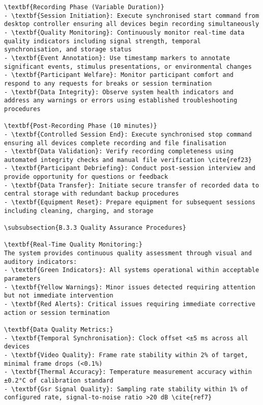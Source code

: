 \begin{verbatim}
\textbf{Recording Phase (Variable Duration)}
- \textbf{Session Initiation}: Execute synchronised start command from desktop controller ensuring all devices begin recording simultaneously
- \textbf{Quality Monitoring}: Continuously monitor real-time data quality indicators including signal strength, temporal synchronisation, and storage status
- \textbf{Event Annotation}: Use timestamp markers to annotate significant events, stimulus presentations, or environmental changes
- \textbf{Participant Welfare}: Monitor participant comfort and respond to any requests for breaks or session termination
- \textbf{Data Integrity}: Observe system health indicators and address any warnings or errors using established troubleshooting procedures

\textbf{Post-Recording Phase (10 minutes)}
- \textbf{Controlled Session End}: Execute synchronised stop command ensuring all devices complete recording and file finalisation
- \textbf{Data Validation}: Verify recording completeness using automated integrity checks and manual file verification \cite{ref23}
- \textbf{Participant Debriefing}: Conduct post-session interview and provide opportunity for questions or feedback
- \textbf{Data Transfer}: Initiate secure transfer of recorded data to central storage with redundant backup procedures
- \textbf{Equipment Reset}: Prepare equipment for subsequent sessions including cleaning, charging, and storage

\subsubsection{B.3.3 Quality Assurance Procedures}

\textbf{Real-Time Quality Monitoring:}
The system provides continuous quality assessment through visual and auditory indicators:
- \textbf{Green Indicators}: All systems operational within acceptable parameters
- \textbf{Yellow Warnings}: Minor issues detected requiring attention but not immediate intervention
- \textbf{Red Alerts}: Critical issues requiring immediate corrective action or session termination

\textbf{Data Quality Metrics:}
- \textbf{Temporal Synchronisation}: Clock offset <±5 ms across all devices
- \textbf{Video Quality}: Frame rate stability within 2% of target, minimal frame drops (<0.1%)
- \textbf{Thermal Accuracy}: Temperature measurement accuracy within ±0.2°C of calibration standard
- \textbf{Gsr Signal Quality}: Sampling rate stability within 1% of configured rate, signal-to-noise ratio >20 dB \cite{ref7}


\end{verbatim}
